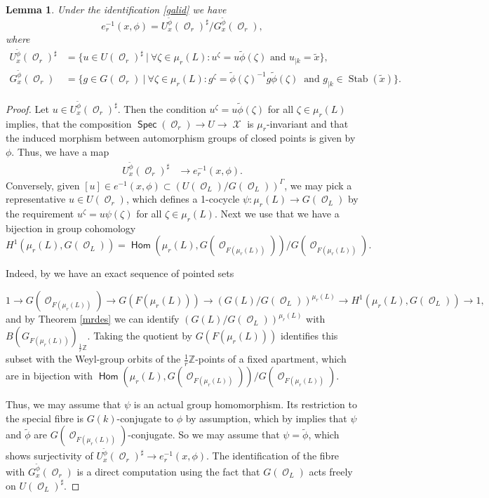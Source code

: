 \documentclass{article}
\DeclareMathOperator{\Xc}{\mathcal{X}}
\DeclareMathOperator{\Oc}{\mathcal{O}}
\DeclareMathOperator{\Hom}{\mathsf{Hom}}
\DeclareMathOperator{\stab}{\mathrm{Stab}}
\DeclareMathOperator{\Spec}{\mathsf{Spec}}
\newcommand{\BZ}{{\mathbb{Z}}}
\theoremstyle{definition}
\theoremstyle{plain}
\newtheorem{lemma}[definition]{Lemma}
\begin{document}
\begin{lemma}\label{efib}
Under the identification \eqref{galid} we have
\[e_r^{-1}(x,\phi) = U_{x}^{\tilde{\phi}}(\Oc_r)^\sharp / G_{x}^{\tilde{\phi}}(\Oc_r),\]
where
\begin{align*}  
U_{x}^{\tilde{\phi}}(\Oc_r)^\sharp &=  \{ u \in U(\Oc_r)^\sharp \ |\ \forall \zeta \in \mu_r(L)\colon u^\zeta = u \tilde{\phi}(\zeta)   \text{ and } u_{|k} = \tilde{x}\}, \\
    G_{ x}^{\tilde{\phi}}(\Oc_r) &= \{g \in G(\Oc_r)\ | \ \forall \zeta \in \mu_r(L)\colon g^{\zeta} = \tilde{\phi}(\zeta)^{-1}g\tilde{\phi}(\zeta) \  \text{ and } g_{|k} \in \stab(\tilde{x})\}.\end{align*}
\end{lemma}
\begin{proof} Let $u \in U_{x}^{\tilde{\phi}}(\Oc_r)^\sharp$. Then the condition $u^\zeta = u \tilde{\phi}(\zeta)$ for all $\zeta \in \mu_r(L)$ implies, that the composition $\Spec(\Oc_r) \to U \to \Xc$ is $\mu_r$-invariant and that the induced morphism between automorphism groups of closed points is given by $\phi$. Thus, we have a map
\begin{align*}U_{x}^{\tilde{\phi}}(\Oc_r)^\sharp &\to e_r^{-1}(x,\phi).
\end{align*}
Conversely, given $[u] \in e^{-1}(x,\phi) \subset (U(\Oc_L)/G(\Oc_L))^\Gamma$, we may pick a representative $u \in U(\Oc_r)$, which defines a 1-cocycle $\psi: \mu_r(L) \to G(\Oc_L)$ by the requirement
$u^\zeta = u \psi(\zeta)$ for all $\zeta \in \mu_r(L)$. Next we use that we have a bijection in group cohomology
\[ H^1(\mu_r(L), G(\Oc_L)) = \Hom(\mu_r(L),G(\Oc_{F(\mu_r(L))}) )/ G(\Oc_{F(\mu_r(L))}). \]

Indeed, by \cite[Proposition I.36]{Se07} we have an exact sequence of pointed sets

\[1 \to G(\Oc_{F(\mu_r(L))}) \to G(F(\mu_r(L))) \to  \left(G(L)/G(\Oc_L) \right)^{\mu_r(L)} \to H^1(\mu_r(L), G(\Oc_L)) \to 1,\]
and by Theorem \ref{mrdes} we can identify $\left(G(L)/G(\Oc_L) \right)^{\mu_r(L)}$ with $B(G_{F(\mu_r(L))})_{\frac{1}{r}\BZ}$. Taking the quotient by $G(F(\mu_r(L)))$ identifies this subset with the Weyl-group orbits of the $\frac{1}{r}\BZ$-points of a fixed apartment, which are in bijection with $\Hom(\mu_r(L),G(\Oc_{F(\mu_r(L))}) )/ G(\Oc_{F(\mu_r(L))})$.



Thus, we may assume that $\psi$ is an actual group homomorphism. Its restriction to the special fibre is $G(k)$-conjugate to $\phi$ by assumption, which by \cite[XI.5.2]{SGA3II} implies that $\psi$ and $\tilde\phi$ are $G(\Oc_{F(\mu_r(L))})$-conjugate. So we may assume that $\psi = \tilde \phi$, which shows surjectivity of $U_{x}^{\tilde{\phi}}(\Oc_r)^\sharp \to e_r^{-1}(x,\phi)$. 
The identification of the fibre with $ G_x^{\tilde{\phi}}(\Oc_r)$ is a direct computation using the fact that $G(\Oc_L)$ acts freely on $U(\Oc_L)^\sharp$. 
\end{proof}
\end{document}
